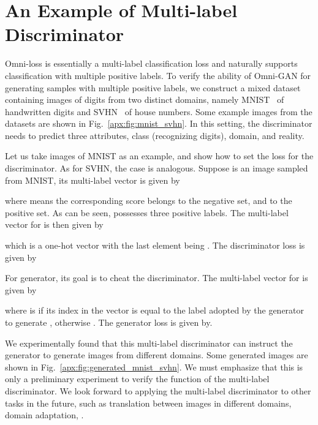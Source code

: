 \documentclass[paper_2425.tex]{subfiles}
\begin{document}
\section{An Example of Multi-label Discriminator}
\label{apx:sec:multi_label_D}


Omni-loss is essentially a multi-label classification loss and naturally supports classification with multiple positive labels. To verify the ability of Omni-GAN for generating samples with multiple positive labels, we construct a mixed dataset containing images of digits from two distinct domains, namely MNIST~\cite{lecun1998gradient} of handwritten digits and SVHN~\cite{netzer2011reading} of house numbers. Some example images from the datasets are shown in Fig.~\ref{apx:fig:mnist_svhn}. In this setting, the discriminator needs to predict three attributes, class (recognizing digits), domain, and reality.

Let us take images of MNIST as an example, and show how to set the loss for the discriminator. As for SVHN, the case is analogous. Suppose  is an image sampled from MNIST, its multi-label vector is given by

where  means the corresponding score belongs to the negative set, and  to the positive set. As can be seen,  possesses three positive labels. The multi-label vector for  is then given by

which is a one-hot vector with the last element being . The discriminator loss is given by


For generator, its goal is to cheat the discriminator. The multi-label vector for  is given by

where  is  if its index in the vector is equal to the label adopted by the generator to generate , otherwise . The generator loss is given by.


We experimentally found that this multi-label discriminator can instruct the generator to generate images from different domains. Some generated images are shown in Fig.~\ref{apx:fig:generated_mnist_svhn}. We must emphasize that this is only a preliminary experiment to verify the function of the multi-label discriminator. We look forward to applying the multi-label discriminator to other tasks in the future, such as translation between images in different domains, domain adaptation, \etc.
\end{document}
